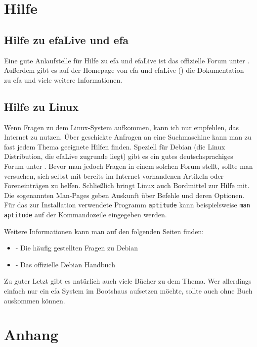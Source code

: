 \documentclass[a4paper,12pt,twoside]{article}
\begin{document}
\section{Hilfe}
\label{sct:hilfe}
\subsection{Hilfe zu efaLive und efa}
\label{sct:hilfe_efa}
Eine gute Anlaufstelle für Hilfe zu efa und efaLive ist das offizielle
Forum unter \cite{EFA3}. Außerdem gibt es auf der Homepage von efa und
efaLive (\cite{EFA1}\cite{EFA4}\cite{EFA5}) die Dokumentation zu efa
und viele weitere Informationen.


\subsection{Hilfe zu Linux}
\label{sct:hilfe_linux}
Wenn Fragen zu dem Linux-System aufkommen, kann ich nur empfehlen, das
Internet zu nutzen. Über geschickte Anfragen an eine Suchmaschine kann
man zu fast jedem Thema geeignete Hilfen finden. Speziell für Debian
(die Linux Distribution, die efaLive zugrunde liegt) gibt es ein gutes
deutschsprachiges Forum unter \cite{HLP1}. Bevor man jedoch Fragen in
einem solchen Forum stellt, sollte man versuchen, sich selbst mit
bereits im Internet vorhandenen Artikeln oder Foreneinträgen zu helfen.
Schließlich bringt Linux auch Bordmittel zur Hilfe mit. Die sogenannten
Man-Pages geben Auskunft über Befehle und deren Optionen. Für das zur
Installation verwendete Programm \texttt{aptitude}
kann beispielsweise \texttt{man aptitude} auf der
Kommandozeile eingegeben werden.

Weitere Informationen kann man auf den folgenden Seiten finden:

\begin{itemize}
    \item \cite{HLP2} - Die häufig gestellten Fragen zu Debian
    \item \cite{HLP3} - Das offizielle Debian Handbuch
\end{itemize}

Zu guter Letzt gibt es natürlich auch viele Bücher zu dem Thema. Wer
allerdings einfach nur ein efa System im Bootshaus aufsetzen möchte,
sollte auch ohne Buch auskommen können.


\clearpage
\section{Anhang}
\label{sct:anhang}
\end{document}
